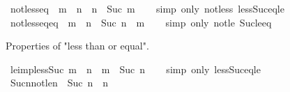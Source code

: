 \begin{isabellebody}
\isamarkupfalse%
\ not{\isacharunderscore}{\kern0pt}less{\isacharunderscore}{\kern0pt}eq{\isacharcolon}{\kern0pt}\ {\isachardoublequoteopen}{\isasymnot}\ m\ {\isacharless}{\kern0pt}\ n\ {\isasymlongleftrightarrow}\ n\ {\isacharless}{\kern0pt}\ Suc\ m{\isachardoublequoteclose}\isanewline
%
\isadelimproof
\ \ %
\endisadelimproof
%
\isatagproof
{}\isamarkupfalse%
\ {\isacharparenleft}{\kern0pt}simp\ only{\isacharcolon}{\kern0pt}\ not{\isacharunderscore}{\kern0pt}less\ less{\isacharunderscore}{\kern0pt}Suc{\isacharunderscore}{\kern0pt}eq{\isacharunderscore}{\kern0pt}le{\isacharparenright}{\kern0pt}%
\endisatagproof
{\isafoldproof}%
%
\isadelimproof
\isanewline
%
\endisadelimproof
\isanewline
{}\isamarkupfalse%
\ not{\isacharunderscore}{\kern0pt}less{\isacharunderscore}{\kern0pt}eq{\isacharunderscore}{\kern0pt}eq{\isacharcolon}{\kern0pt}\ {\isachardoublequoteopen}{\isasymnot}\ m\ {\isasymle}\ n\ {\isasymlongleftrightarrow}\ Suc\ n\ {\isasymle}\ m{\isachardoublequoteclose}\isanewline
%
\isadelimproof
\ \ %
\endisadelimproof
%
\isatagproof
{}\isamarkupfalse%
\ {\isacharparenleft}{\kern0pt}simp\ only{\isacharcolon}{\kern0pt}\ not{\isacharunderscore}{\kern0pt}le\ Suc{\isacharunderscore}{\kern0pt}le{\isacharunderscore}{\kern0pt}eq{\isacharparenright}{\kern0pt}%
\endisatagproof
{\isafoldproof}%
%
\isadelimproof
%
\endisadelimproof
%
\begin{isamarkuptext}%
Properties of "less than or equal".%
\end{isamarkuptext}\isamarkuptrue%
\isamarkupfalse%
\ le{\isacharunderscore}{\kern0pt}imp{\isacharunderscore}{\kern0pt}less{\isacharunderscore}{\kern0pt}Suc{\isacharcolon}{\kern0pt}\ {\isachardoublequoteopen}m\ {\isasymle}\ n\ {\isasymLongrightarrow}\ m\ {\isacharless}{\kern0pt}\ Suc\ n{\isachardoublequoteclose}\isanewline
%
\isadelimproof
\ \ %
\endisadelimproof
%
\isatagproof
{}\isamarkupfalse%
\ {\isacharparenleft}{\kern0pt}simp\ only{\isacharcolon}{\kern0pt}\ less{\isacharunderscore}{\kern0pt}Suc{\isacharunderscore}{\kern0pt}eq{\isacharunderscore}{\kern0pt}le{\isacharparenright}{\kern0pt}%
\endisatagproof
{\isafoldproof}%
%
\isadelimproof
\isanewline
%
\endisadelimproof
\isanewline
{}\isamarkupfalse%
\ Suc{\isacharunderscore}{\kern0pt}n{\isacharunderscore}{\kern0pt}not{\isacharunderscore}{\kern0pt}le{\isacharunderscore}{\kern0pt}n{\isacharcolon}{\kern0pt}\ {\isachardoublequoteopen}{\isasymnot}\ Suc\ n\ {\isasymle}\ n{\isachardoublequoteclose}\isanewline
%
\isadelimproof
\ \ %
\endisadelimproof

\end{isabellebody}

